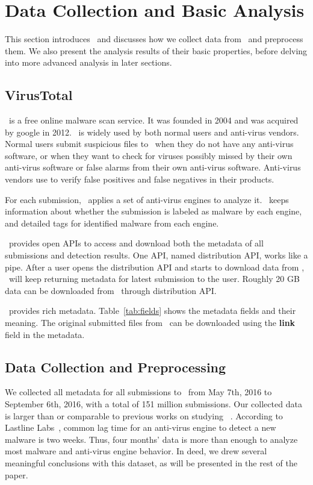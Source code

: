 \section{Data Collection and Basic Analysis}
\label{sec:meth}

This section introduces \vt\ and 
discusses how we collect data from \vt\ and preprocess them.
We also present the analysis results of their basic properties, 
before delving into more advanced analysis in later sections.


\subsection{VirusTotal}
\vt\ is a free online malware scan service.
It was founded in 2004 and was acquired by google in 2012. 
\vt\ is widely used by both normal users and anti-virus vendors.
Normal users submit suspicious files to \vt\ when they do not have any anti-virus software, 
or when they want to check for viruses possibly missed by their own anti-virus software 
or false alarms from their own anti-virus software.  
Anti-virus vendors use \vt to verify false positives and false negatives in their products.

For each submission, \vt\ applies a set of anti-virus engines to analyze it. 
\vt\ keeps information about whether the submission is labeled as malware by each engine, 
and detailed tags for identified malware from each engine. 

\vt\ provides open APIs to access and download both the metadata of all submissions and detection results.
One API, named distribution API, works like a pipe.
After a user opens the distribution API and starts to download data from \vt, 
\vt\ will keep returning metadata for latest submission to the user. 
Roughly 20 GB data can be downloaded from \vt\ through distribution API.  

\vt\ provides rich metadata.
Table~\ref{tab:fields} shows the metadata fields and their meaning.  
The original submitted files from \vt\ can be downloaded using the {\bf link} field in the metadata.

\subsection{Data Collection and Preprocessing}
We collected all metadata for all submissions to \vt\ from May 7th, 2016 to September 6th, 2016,
with a total of 151 million submissions. 
Our collected data is larger than or comparable to previous works on studying \vt~\cite{SongAPsys2016,huangvt2016bigdata}.
According to Lastline Labs~\cite{Lastline}, common lag time for an anti-virus engine to detect a new malware is two weeks.
Thus, four months' data is more than enough to analyze most malware and anti-virus engine behavior. 
In deed, we drew several meaningful conclusions with this dataset, as will be presented in the rest of the paper.

